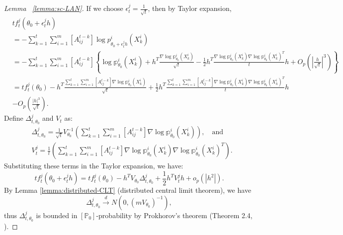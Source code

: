 \documentclass[twoside,11pt]{article}
\numberwithin{equation}{section}
\newcommand\bP{\mathbb{P}}
\newcommand\bp{\mathbb{p}}
\newcommand{\dto}{\stackrel{d}{\to}}
\begin{document}
{\begin{proof}[Lemma ~\ref{lemma:sc-LAN}]
If we choose $\epsilon_t^j = \frac{1}{\sqrt{t}}$, then by Taylor expansion, 
\begin{align*}
& t f_t^j(\theta_0 + \epsilon_t^j h) \\
&=  - \sum_{k = 1}^t \sum_{i = 1}^m [A^{t - k}_{ij}]\log p_{\theta_0 +  \epsilon_t^j h}^i(X_k^i)  \\
&=  - \sum_{k = 1}^t \sum_{i = 1}^m [A^{t - k}_{ij}] \left\{ \log \bp_{\theta_0}^i (X_k^i) +   h^T \frac{ \nabla \log \bp_{\theta_0}^i(X_k^i)}{\sqrt{t}} - \frac{1}{2}h^T \frac{\nabla \log \bp_{\theta_0}^i(X_k^i) {\nabla \log \bp_{\theta_0}^i(X_k^i)}^T}{t} h   + O_p(|\frac{h}{\sqrt{t}}|^3)\right\}\\
&=  t  f_t^j(\theta_0) -h^T \frac{\sum_{k = 1}^t \sum_{i = 1}^m [A^{t - k}_{ij}]\nabla \log \bp_{\theta_0}^i(X_k^i)}{\sqrt{t}}+ \frac{1}{2} h^T \frac{\sum_{k = 1}^t \sum_{i = 1}^m [A^{t - k}_{ij}]\nabla \log \bp_{\theta_0}^i(X_k^i) {\nabla \log \bp_{\theta_0}^i(X_k^i)}^T}{t} h \\
&- O_p(\frac{|h|^3}{\sqrt{t}}). 
\end{align*}
Define $\Delta_{t, \theta_0}^j$ and $V_t$ as:
\begin{align*}
    &\Delta_{t, \theta_0}^j =\frac{1}{\sqrt{t}} V_{\theta_0}^{-1} \left(\sum_{k = 1}^t \sum_{i = 1}^m [A^{t - k}_{ij}]\nabla \log \bp_{\theta_0}^i(X_k^i)\right), \quad \text{and} \\
   & V_t^j = \frac{1}{t}\left( \sum_{k = 1}^t \sum_{i = 1}^m [A^{t - k}_{ij}]\nabla \log \bp_{\theta_0}^i(X_k^i) {\nabla \log \bp_{\theta_0}^i(X_k^i)}^T \right). 
\end{align*}
Substituting these terms in the Taylor expansion, we have:
\begin{equation*}
   t f_t^j(\theta_0 + \epsilon_t^j h)  =  t  f_t^j(\theta_0) - h^T V_{\theta_0} \Delta_{t, \theta_0}^j  + \frac{1}{2} h^T V_t^j h + o_p(|h^2|). 
\end{equation*}
By Lemma \ref{lemma:distributed-CLT} (distributed central limit theorem), we have
\begin{equation*}
    \Delta_{t, \theta_0}^j \dto N(0, (m V_{\theta_0})^{-1}), 
\end{equation*}
thus $\Delta_{t, \theta_0}^j$ is bounded in $[\bP_0]$-probability by Prokhorov's theorem (Theorem 2.4, \cite{VanderVaart2000}). 


\end{proof}}
\end{document}

